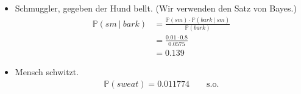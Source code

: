 \documentclass[a4paper]{scrartcl}
\newcommand{\prob}{\mathbb{P}}
\begin{document}
\begin{itemize}
    \item
        Schmuggler, gegeben der Hund bellt.
        (Wir verwenden den Satz von Bayes.)
        \begin{equation*}
            \begin{split}
                \prob(sm\ |\ bark)
                &= \frac{\prob(sm) \cdot \prob(bark\ |\ sm)}{\prob(bark)} \\
                &= \frac{\num{0,01} \cdot \num{0,8}}{\num{0,0575}} \\
                &= \num{0.139}
            \end{split}
        \end{equation*}

    \item Mensch schwitzt.
        \begin{equation*}
            \begin{split}
                \prob(sweat) = \num{0.011774}
                \qquad \text{s.o.}
            \end{split}
        \end{equation*}


\end{itemize}
\end{document}
